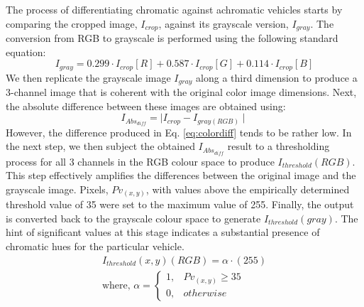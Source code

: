 The process of differentiating chromatic against achromatic vehicles starts by comparing the cropped image, $I_{crop}$, against its grayscale version, $I_{gray}$.
The conversion from RGB to grayscale is performed using the following standard equation:
\begin{equation}
I_{gray} = 0.299 \cdot I_{crop}[R]+0.587 \cdot I_{crop}[G]+0.114 \cdot I_{crop}[B]
\label{eq:rgb2gray}
\end{equation}
We then replicate the grayscale image $I_{gray}$ along a third dimension to produce a 3-channel image that is coherent with the original color image dimensions.
Next, the absolute difference between these images are obtained using: 
\begin{equation}
    I_{Abs_{diff}} = \mid I_{crop} - I_{gray(RGB)} \mid
\label{eq:colordiff}
\end{equation}
However, the difference produced in Eq. \ref{eq:colordiff} tends to be rather low. In the next step, we then subject the obtained $I_{Abs_{diff}}$ result to a thresholding process for all 3 channels in the RGB colour space to produce $I_{threshold}(RGB)$.
This step effectively amplifies the differences between the original image and the grayscale image. Pixels, $Pv_{(x,y)}$, with values above the empirically determined threshold value of 35 were set to the maximum value of 255.
Finally, the output %
is converted back to the grayscale colour space to generate $I_{threshold}(gray)$. The hint of significant values at this stage indicates a substantial presence of chromatic hues for the particular vehicle.
\begin{align*}
\label{eq:threshabsolutediff}
I_{threshold}(x,y)(RGB) = \alpha \cdot (255) \\
\text{where, }
\alpha =
\begin{cases}
1, & Pv_{(x,y)} \geq 35\\
0, & otherwise
\end{cases}
\end{align*}

